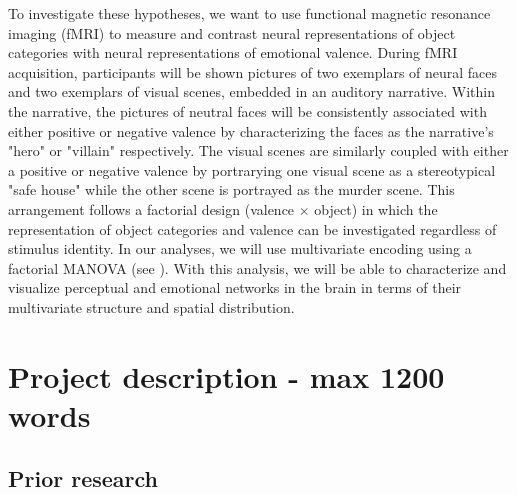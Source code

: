 \documentclass[12pt,a4paper]{article}\usepackage[]{graphicx}\usepackage[]{color}
\begin{document}
To investigate these hypotheses, we want to use functional magnetic resonance imaging (fMRI) to measure and contrast neural representations of object categories with neural representations of emotional valence. During fMRI acquisition, participants will be shown pictures of two exemplars of neural faces and two exemplars of visual scenes, embedded in an auditory narrative. Within the narrative, the pictures of neutral faces will be consistently associated with either positive or negative valence by characterizing the faces as the narrative's "hero" or "villain" respectively. The visual scenes are similarly coupled with either a positive or negative valence by portrarying one visual scene as a stereotypical "safe house" while the other scene is portrayed as the murder scene. This arrangement follows a factorial design (valence $\times$ object) in which the representation of object categories and valence can be investigated regardless of stimulus identity. In our analyses, we will
use multivariate encoding using a factorial MANOVA (see \citep{kornysheva2014}). With this analysis, we will be able to characterize and visualize perceptual and emotional networks in the brain in terms of their multivariate structure and spatial distribution. \\

\noindent
\wordcount

\section{Project description \textmd{- max 1200 words}}
\subsection{Prior research}
%
\end{document}
